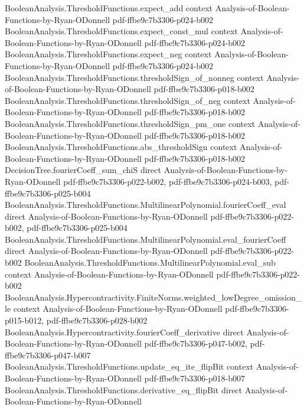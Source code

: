 \begin{lemma}
  {BooleanAnalysis.ThresholdFunctions.expect_add}
  {context}
  {Analysis-of-Boolean-Functions-by-Ryan-ODonnell}
  {pdf-ffbe9c7b3306-p024-b002}
\proofstep
  {BooleanAnalysis.ThresholdFunctions.expect_const_mul}
  {context}
  {Analysis-of-Boolean-Functions-by-Ryan-ODonnell}
  {pdf-ffbe9c7b3306-p024-b002}
\proofstep
  {BooleanAnalysis.ThresholdFunctions.expect_neg}
  {context}
  {Analysis-of-Boolean-Functions-by-Ryan-ODonnell}
  {pdf-ffbe9c7b3306-p024-b002}
\proofstep
  {BooleanAnalysis.ThresholdFunctions.thresholdSign_of_nonneg}
  {context}
  {Analysis-of-Boolean-Functions-by-Ryan-ODonnell}
  {pdf-ffbe9c7b3306-p018-b002}
\proofstep
  {BooleanAnalysis.ThresholdFunctions.thresholdSign_of_neg}
  {context}
  {Analysis-of-Boolean-Functions-by-Ryan-ODonnell}
  {pdf-ffbe9c7b3306-p018-b002}
\proofstep
  {BooleanAnalysis.ThresholdFunctions.thresholdSign_pm_one}
  {context}
  {Analysis-of-Boolean-Functions-by-Ryan-ODonnell}
  {pdf-ffbe9c7b3306-p018-b002}
\proofstep
  {BooleanAnalysis.ThresholdFunctions.abs_thresholdSign}
  {context}
  {Analysis-of-Boolean-Functions-by-Ryan-ODonnell}
  {pdf-ffbe9c7b3306-p018-b002}
\proofstep
  {DecisionTree.fourierCoeff_sum_chiS}
  {direct}
  {Analysis-of-Boolean-Functions-by-Ryan-ODonnell}
  {pdf-ffbe9c7b3306-p022-b002,
    pdf-ffbe9c7b3306-p024-b003,
    pdf-ffbe9c7b3306-p025-b004}
\proofstep
  {BooleanAnalysis.ThresholdFunctions.MultilinearPolynomial.fourierCoeff_eval}
  {direct}
  {Analysis-of-Boolean-Functions-by-Ryan-ODonnell}
  {pdf-ffbe9c7b3306-p022-b002,
    pdf-ffbe9c7b3306-p025-b004}
\proofstep
  {BooleanAnalysis.ThresholdFunctions.MultilinearPolynomial.eval_fourierCoeff}
  {direct}
  {Analysis-of-Boolean-Functions-by-Ryan-ODonnell}
  {pdf-ffbe9c7b3306-p022-b002}
\proofstep
  {BooleanAnalysis.ThresholdFunctions.MultilinearPolynomial.eval_sub}
  {context}
  {Analysis-of-Boolean-Functions-by-Ryan-ODonnell}
  {pdf-ffbe9c7b3306-p022-b002}
\proofstep
  {BooleanAnalysis.Hypercontractivity.FiniteNorms.weighted_lowDegree_omission_le}
  {context}
  {Analysis-of-Boolean-Functions-by-Ryan-ODonnell}
  {pdf-ffbe9c7b3306-p015-b012,
    pdf-ffbe9c7b3306-p028-b002}
\proofstep
  {BooleanAnalysis.Hypercontractivity.fourierCoeff_derivative}
  {direct}
  {Analysis-of-Boolean-Functions-by-Ryan-ODonnell}
  {pdf-ffbe9c7b3306-p047-b002,
    pdf-ffbe9c7b3306-p047-b007}
\proofstep
  {BooleanAnalysis.ThresholdFunctions.update_eq_ite_flipBit}
  {context}
  {Analysis-of-Boolean-Functions-by-Ryan-ODonnell}
  {pdf-ffbe9c7b3306-p018-b007}
\proofstep
  {BooleanAnalysis.ThresholdFunctions.derivative_eq_flipBit}
  {direct}
  {Analysis-of-Boolean-Functions-by-Ryan-ODonnell}

\end{lemma}
